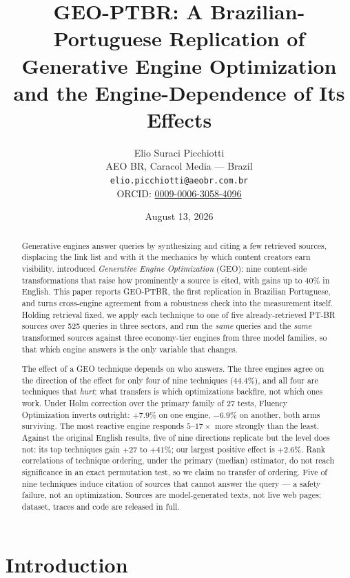 \documentclass[11pt,a4paper]{article}
\title{GEO-PTBR: A Brazilian-Portuguese Replication of Generative Engine
  Optimization and the Engine-Dependence of Its Effects}
\author{
  Elio Suraci Picchiotti \\
  AEO BR, Caracol Media --- Brazil \\[2pt]
  {\normalsize\texttt{elio.picchiotti@aeobr.com.br}} \\[1pt]
  {\normalsize ORCID:
    \href{https://orcid.org/0009-0006-3058-4096}{0009-0006-3058-4096}}
}
\date{August 13, 2026}
\begin{document}
\maketitle

\begin{abstract}
Generative engines answer queries by synthesizing and citing a few retrieved
sources, displacing the link list and with it the mechanics by which content
creators earn visibility. \citet{aggarwal2024geo} introduced
\emph{Generative Engine Optimization} (GEO): nine content-side
transformations that raise how prominently a source is cited, with gains up
to $40\%$ in English. This paper reports GEO-PTBR, the first replication in
Brazilian Portuguese, and turns cross-engine agreement from a robustness
check into the measurement itself. Holding retrieval fixed, we apply each
technique to one of five already-retrieved PT-BR sources over 525 queries in
three sectors, and run the \emph{same} queries and the \emph{same}
transformed sources against three economy-tier engines from three model
families, so that which engine answers is the only variable that changes.

The effect of a GEO technique depends on who answers. The three engines
agree on the direction of the effect for only four of nine techniques
($44.4\%$), and all four are techniques that \emph{hurt}: what transfers is
which optimizations backfire, not which ones work. Under Holm correction over the primary
family of 27 tests, Fluency Optimization inverts outright: $+7.9\%$ on one
engine, $-6.9\%$ on another, both arms surviving. The most reactive engine
responds $5$--$17\times$ more strongly than the least. Against the
original English results, five of nine directions replicate but the level
does not: its top techniques gain $+27$ to $+41\%$; our largest positive
effect is $+2.6\%$. Rank correlations of technique ordering, under the
primary (median) estimator, do not reach significance in an exact
permutation test, so we claim no transfer of ordering.
Five of nine techniques induce citation of sources that cannot answer the
query --- a safety failure, not an optimization. Sources are
model-generated texts, not live web pages; dataset, traces and code are
released in full.
\end{abstract}

\section{Introduction}
\end{document}
